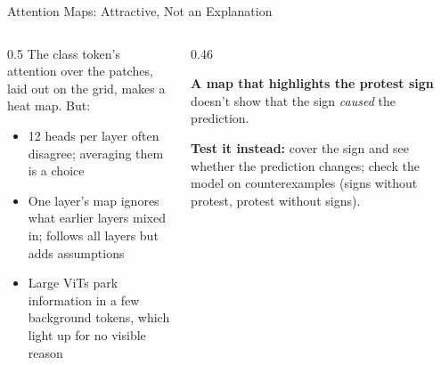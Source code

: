 \begin{frame}{Attention Maps: Attractive, Not an Explanation}
\begin{columns}[T]
\begin{column}{0.5\textwidth}
The class token's attention over the patches, laid out on the grid, makes a heat map. But:

\begin{itemize}
\item 12 heads per layer often disagree; averaging them is a choice
\item One layer's map ignores what earlier layers mixed in;  follows all layers
      but adds assumptions 
\item Large ViTs park information in a few background tokens, which light up for no visible
      reason 
\end{itemize}
\end{column}
\begin{column}{0.46\textwidth}
\begin{warnbox}
\textbf{A map that highlights the protest sign} doesn't show that the sign \emph{caused} the
prediction.
\end{warnbox}
\begin{greenbox}
\textbf{Test it instead:} cover the sign and see whether the prediction changes; check the model on
counterexamples (signs without protest, protest without signs).
\end{greenbox}
\end{column}
\end{columns}
\end{frame}

